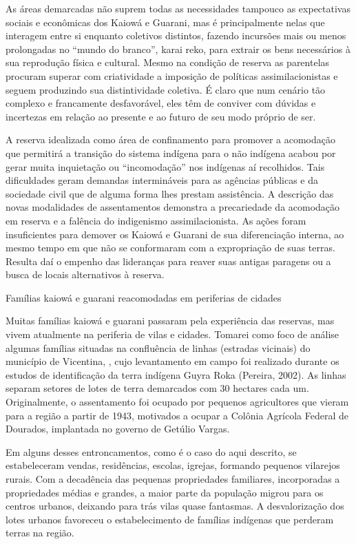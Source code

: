 As áreas demarcadas não suprem todas as necessidades tampouco as
expectativas sociais e econômicas dos Kaiowá e Guarani, mas é
principalmente nelas que interagem entre si enquanto coletivos
distintos, fazendo incursões mais ou menos prolongadas no ``mundo do
branco'', karai reko, para extrair os bens necessários à sua reprodução
física e cultural. Mesmo na condição de reserva as parentelas procuram
superar com criatividade a imposição de políticas assimilacionistas e
seguem produzindo sua distintividade coletiva. É claro que num cenário
tão complexo e francamente desfavorável, eles têm de conviver com
dúvidas e incertezas em relação ao presente e ao futuro de seu modo
próprio de ser. 

A reserva idealizada como área de confinamento para promover a
acomodação que permitirá a transição do sistema indígena para o não
indígena acabou por gerar muita inquietação ou ``incomodação'' nos
indígenas aí recolhidos. Tais dificuldades geram demandas intermináveis
para as agências públicas e da sociedade civil que de alguma forma lhes
prestam assistência. A descrição das novas modalidades de assentamentos
demonstra a precariedade da acomodação em reserva e a falência do
indigenismo assimilacionista. As ações foram insuficientes para demover
os Kaiowá e Guarani de sua diferenciação interna, ao mesmo tempo em que
não se conformaram com a expropriação de suas terras. Resulta daí o
empenho das lideranças para reaver suas antigas paragens ou a busca de
locais alternativos à reserva.

Famílias kaiowá e guarani reacomodadas em periferias de cidades

Muitas famílias kaiowá e guarani passaram pela experiência das reservas,
mas vivem atualmente na periferia de vilas e cidades. Tomarei como foco
de análise algumas famílias situadas na confluência de linhas (estradas
vicinais) do município de Vicentina, , cujo levantamento em campo foi
realizado durante os estudos de identificação da terra indígena Guyra
Roka (Pereira, 2002). As linhas separam setores de lotes de terra
demarcados com 30 hectares cada um. Originalmente, o assentamento foi
ocupado por pequenos agricultores que vieram para a região a partir de
1943, motivados a ocupar a Colônia Agrícola Federal de Dourados,
implantada no governo de Getúlio Vargas.

Em alguns desses entroncamentos, como é o caso do aqui descrito, se
estabeleceram vendas, residências, escolas, igrejas, formando pequenos
vilarejos rurais. Com a decadência das pequenas propriedades
familiares, incorporadas a propriedades médias e grandes, a maior parte
da população migrou para os centros urbanos, deixando para trás vilas
quase fantasmas. A desvalorização dos lotes urbanos favoreceu o
estabelecimento de famílias indígenas que perderam terras na região.

